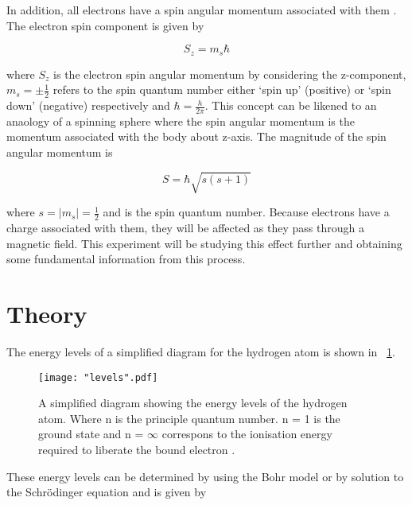 \documentclass{article}
\newcommand{\figref}[2][\figurename~]{#1\ref{#2}}
\begin{document}
\vspace{2mm}
\noindent
In addition, all electrons have a spin angular momentum associated with them \cite{Paper02}. The electron spin component is given by

\begin{equation}
\label{eq:spin}
S_z = m_s\hbar
\end{equation}

\vspace{2mm}
\noindent
where $S_z$ is the electron spin angular momentum by considering the z-component, $m_s = \pm\frac{1}{2}$ refers to the spin quantum number either `spin up' (positive) or `spin down' (negative) respectively and $\hbar = \frac{h}{2\pi}$. This concept can be likened to an anaology of a spinning sphere \cite{Book01} where the spin angular momentum is the momentum associated with the body about z-axis. The magnitude of the spin angular momentum is

\begin{equation}
\label{eq:spin-magnitude}
S = \hbar\sqrt{s(s+1)}
\end{equation}

\vspace{2mm}
\noindent
where $s = \mid{m_s}\mid = \frac{1}{2}$ and is the spin quantum number. Because electrons have a charge associated with them, they will be affected as they pass through a magnetic field. %
 This experiment will be studying this effect further and obtaining some fundamental information from this process.

\section{Theory}
\label{sec:theory}

The energy levels of a simplified diagram for the hydrogen atom is shown in \figref{fig:levels}.

\begin{figure}[h]
\centering
\texttt{[image: "levels".pdf]}
\caption{A simplified diagram showing the energy levels of the hydrogen atom. Where n is the principle quantum number. n = 1 is the ground state and n = $\infty$ correspons to the ionisation energy required to liberate the bound electron \cite{Paper01}.}
\label{fig:levels}
\end{figure}

\vspace{2mm}
\noindent
These energy levels can be determined by using the Bohr model or by solution to the Schr\"{o}dinger equation \cite{Paper01} and is given by
\end{document}
